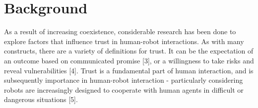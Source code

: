 \documentclass{sig-alternate}
\begin{document}
	
\section{Background}
As a result of increasing coexistence, considerable research has been done to explore factors that influence trust in human-robot interactions. As with many constructs, there are a variety of definitions for trust. It can be the expectation of an outcome based on communicated promise [3], or a willingness to take risks and reveal vulnerabilities [4]. Trust is a fundamental part of human interaction, and is subsequently importance in human-robot interaction - particularly considering robots are increasingly designed to cooperate with human agents in difficult or dangerous situations [5].
\end{document}
